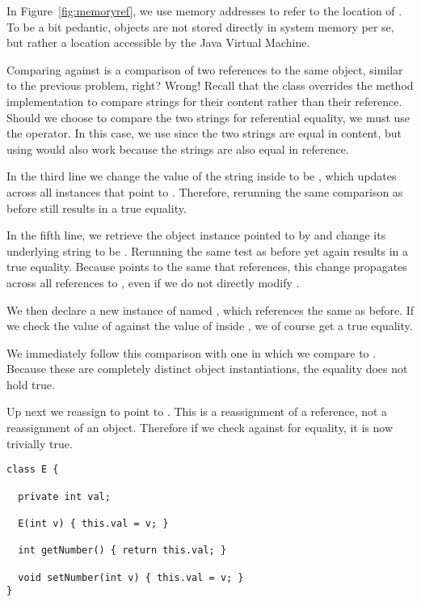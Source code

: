 In Figure~\ref{fig:memoryref}, we use memory addresses to refer to the location of . To be a bit pedantic, objects are not stored directly in system memory per se, but rather a location accessible by the Java Virtual Machine.

Comparing  against  is a comparison of two references to the same object, similar to the previous problem, right? Wrong! Recall that the  class overrides the  method implementation to compare strings for their content rather than their reference. Should we choose to compare the two strings for referential equality, we must use the \ttt{==} operator. In this case, we use  since the two strings are equal in content, but using \ttt{==} would also work because the strings are also equal in reference.

In the third line we change the value of the string inside  to be , which updates across all instances that point to . Therefore, rerunning the same comparison as before still results in a true equality.

In the fifth line, we retrieve the  object instance pointed to by  and change its underlying string to be . Rerunning the same test as before yet again results in a true equality. Because  points to the same  that  references, this change propagates across all references to , even if we do not directly modify .

We then declare a new instance of  named , which references the same  as before. If we check the value of  against the value of  inside , we of course get a true equality.

We immediately follow this comparison with one in which we compare  to . Because these are completely distinct object instantiations, the equality does not hold true.

Up next we reassign  to point to . This is a reassignment of a reference, not a reassignment of an object. Therefore if we check  against  for equality, it is now trivially true.


\begin{lstlisting}[language=MyJava]
class E {

  private int val;

  E(int v) { this.val = v; }

  int getNumber() { return this.val; }

  void setNumber(int v) { this.val = v; }
}
\end{lstlisting}

